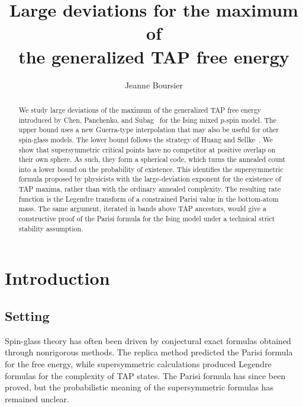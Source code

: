 \documentclass[a4paper,10pt,reqno]{amsart}
\title[Large deviations for the maximum of the generalized TAP free energy]{Large deviations for the maximum of\\ the generalized TAP free energy}
\author{Jeanne Boursier}
\numberwithin{equation}{section}
\begin{document}
	
	\begin{abstract}
		We study large deviations of the maximum of the generalized TAP free
		energy introduced by Chen, Panchenko, and Subag~\cite{ChenPanchenkoSubag}
		for the Ising mixed \(p\)-spin model. The upper bound uses a new
		Guerra-type interpolation that may also be useful for other spin-glass
		models. The lower bound follows the strategy of Huang and
		Sellke~\cite{HuangSellke}. We show that supersymmetric critical points have
		no competitor at positive overlap on their own sphere. As such, they form
		a spherical code, which turns the annealed count into a lower bound on the
		probability of existence. This identifies the supersymmetric formula
		proposed by physicists with the large-deviation exponent for the existence
		of TAP maxima, rather than with the ordinary annealed complexity. The
		resulting rate function is the Legendre
		transform of a constrained Parisi value in the bottom-atom mass. The same
		argument, iterated in bands above TAP ancestors, would give a constructive
		proof of the Parisi formula for the Ising model under a technical strict
		stability assumption.
	\end{abstract}
	
	\maketitle
	
	\setcounter{tocdepth}{1}
	\tableofcontents
	
	\section{Introduction}
	
	\subsection{Setting}\label{sub:setup}
	
	Spin-glass theory has often been driven by conjectural exact formulas
	obtained through nonrigorous methods. The replica method predicted the
	Parisi formula for the free energy, while supersymmetric calculations
	produced Legendre formulas for the complexity of TAP states. The Parisi
	formula has since been proved, but the probabilistic meaning of the
	supersymmetric formulas has remained unclear.
	
\end{document}
